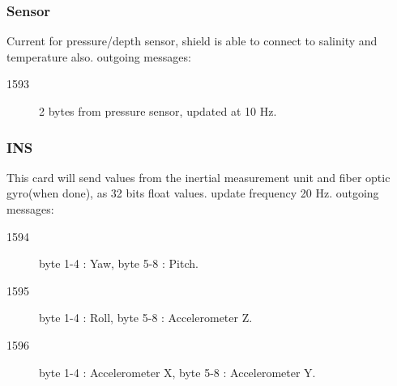 \subsubsection{Sensor}
Current for pressure/depth sensor, shield is able to connect to salinity and temperature also.\newline
outgoing messages:
\begin{description}
  \item[1593] 2 bytes from pressure sensor, updated at 10 Hz.
\end{description}


\subsubsection{INS}
This card will send values from the inertial measurement unit and fiber optic gyro(when done), as 32 bits float values.\newline
update frequency 20 Hz.\newline
outgoing messages:
\begin{description}
  \item[1594] byte 1-4 : Yaw, byte 5-8 : Pitch.
  \item[1595] byte 1-4 : Roll, byte 5-8 : Accelerometer Z.
  \item[1596] byte 1-4 : Accelerometer X, byte 5-8 : Accelerometer Y.
\end{description}



